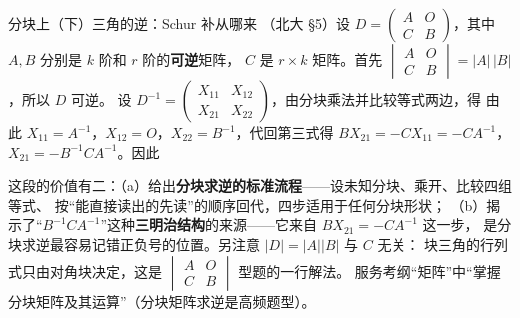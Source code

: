 \begin{fdeep}{分块上（下）三角的逆：Schur 补从哪来}
（北大 §5）设 $D=\begin{pmatrix}A&O\\C&B\end{pmatrix}$，其中 $A,B$ 分别是 $k$ 阶和 $r$ 阶的\textbf{可逆}矩阵，
$C$ 是 $r\times k$ 矩阵。首先 $\begin{vmatrix}A&O\\C&B\end{vmatrix}=|A|\,|B|$，所以 $D$ 可逆。
设 $D^{-1}=\begin{pmatrix}X_{11}&X_{12}\\X_{21}&X_{22}\end{pmatrix}$，由分块乘法并比较等式两边，得
由此 $X_{11}=A^{-1}$，$X_{12}=O$，$X_{22}=B^{-1}$，代回第三式得 $BX_{21}=-CX_{11}=-CA^{-1}$，
$X_{21}=-B^{-1}CA^{-1}$。因此

这段的价值有二：（a）给出\textbf{分块求逆的标准流程}——设未知分块、乘开、比较四组等式、
按“能直接读出的先读”的顺序回代，四步适用于任何分块形状；
（b）揭示了“$B^{-1}CA^{-1}$”这种\textbf{三明治结构}的来源——它来自 $BX_{21}=-CA^{-1}$ 这一步，
是分块求逆最容易记错正负号的位置。另注意 $|D|=|A||B|$ 与 $C$ 无关：
块三角的行列式只由对角块决定，这是 $\begin{vmatrix}A&O\\C&B\end{vmatrix}$ 型题的一行解法。
\fbref{}服务考纲“矩阵”中“掌握分块矩阵及其运算”（分块矩阵求逆是高频题型）。
\end{fdeep}

